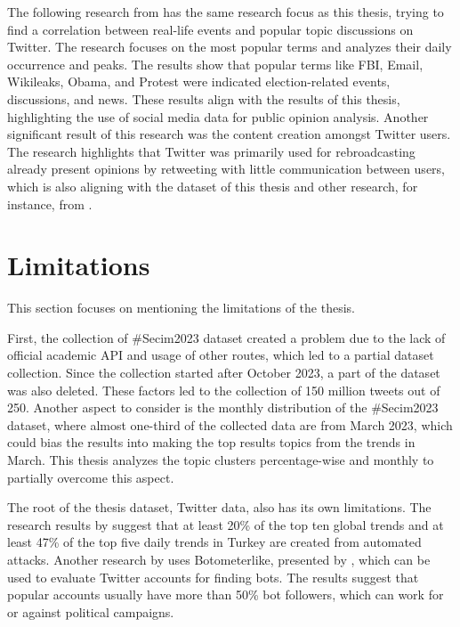 The following research from \textcite{yaqub_US_election_analysis_2017} has the same research focus as 
this thesis, trying to find a correlation between real-life events and popular topic discussions on 
Twitter. The research focuses on the most popular terms and analyzes their daily occurrence and peaks. 
The results show that popular terms like FBI, Email, Wikileaks, Obama, and Protest were indicated 
election-related events, discussions, and news. These results align with the results of this thesis, 
highlighting the use of social media data for public opinion analysis. Another significant result of 
this research was the content creation amongst Twitter users. The research highlights that Twitter was 
primarily used for rebroadcasting already present opinions by retweeting with little communication 
between users, which is also aligning with the dataset of this thesis and other research, for 
instance, from \textcite{pfeffer_twitter_24_Hours_just_another_day_2023}.


\section{Limitations}

This section focuses on mentioning the limitations of the thesis. 

First, the collection of \#Secim2023 dataset created a problem due to the lack of official academic API and 
usage of other routes, which led to a partial dataset collection. Since the collection started after 
October 2023, a part of the dataset was also deleted. These factors led to the collection of 150 million 
tweets out of 250. Another aspect to consider is the monthly distribution of the \#Secim2023 dataset, 
where almost one-third of the collected data are from March 2023, which could bias the results into making 
the top results topics from the trends in March. This thesis analyzes the topic clusters percentage-wise 
and monthly to partially overcome this aspect.

The root of the thesis dataset, Twitter data, also has its own limitations. The research results by 
\textcite{elmas_fake_attack_2021} suggest that at least 20\% of the top ten global trends and at least 47\% 
of the top five daily trends in Turkey are created from automated attacks. Another research by 
\textcite{secim2023} uses Botometerlike, presented by \textcite{yang_botometer_2022}, which can be used 
to evaluate Twitter accounts for finding bots. The results suggest that popular accounts usually have more 
than 50\% bot followers, which can work for or against political campaigns. 

